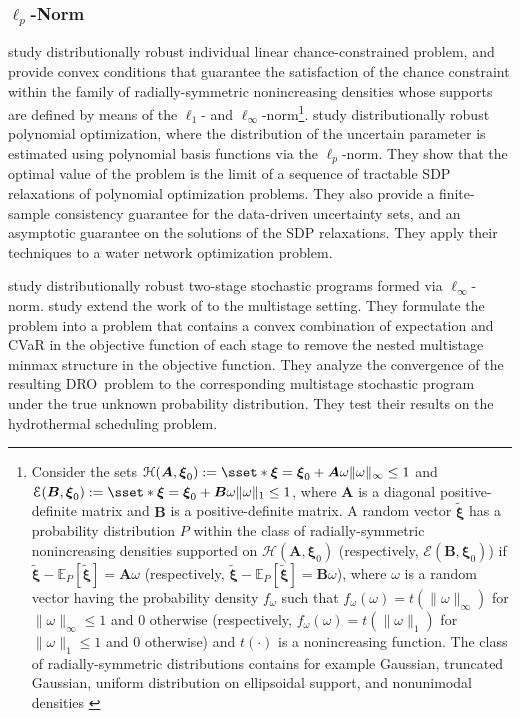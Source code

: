 \documentclass[final,onefignum,onetabnum]{class}
\newcommand{\ee}[2]{\mathbb{E}_{#1} \left[ #2 \right]}
\newcommand{\bs}[1]{\boldsymbol{#1}} %
\newcommand{\Cs}[1]{\mathcal{#1}} %
\newcommand{\txi}{\tilde{\bs{\xi}}}
\newcommand{\dro}{DRO}
\begin{document}
\subsubsection[Lp-Norm]{\texorpdfstring{$\ell_{p}$-Norm}{Lp-Norm}}

\citet{calafiore2006} study distributionally robust individual linear chance-constrained problem, and provide convex conditions that guarantee the satisfaction of the chance constraint   within the family of radially-symmetric nonincreasing densities whose supports are defined by means of the $\ell_{1}$- and $\ell_{\infty}$-norm\footnote{Consider the sets $\Cs{H}(\bs{A},\bs{\xi}_{0}):=\sset*{\bs{\xi}=\bs{\xi}_{0} + \bs{A} \omega}{\|\omega\|_{\infty} \le 1}$ and $\Cs{E}(\bs{B},\bs{\xi}_{0}):=\sset*{\bs{\xi}=\bs{\xi}_{0} + \bs{B} \omega}{\|\omega\|_{1} \le 1}$, where $\bs{A}$ is a diagonal positive-definite matrix and $\bs{B}$ is a positive-definite matrix. 
A random vector $\txi$ has a probability distribution $P$ within the class of radially-symmetric nonincreasing densities supported on  $\Cs{H}(\bs{A},\bs{\xi}_{0})$ (respectively, $\Cs{E}(\bs{B},\bs{\xi}_{0})$) if $\txi - \ee{P}{\txi}= \bs{A} \omega$ (respectively, $\txi - \ee{P}{\txi}= \bs{B} \omega$), where $\omega$ is a random vector having the probability density $f_{\omega}$ such that 
$f_{\omega}(\omega)= t(\|\omega\|_{\infty})$ for $\|\omega\|_{\infty} \le 1$ and $0$ otherwise (respectively, $f_{\omega}(\omega)= t(\|\omega\|_{1})$ for $\|\omega\|_{1} \le 1$ and $0$ otherwise) and $t(\cdot)$ is a nonincreasing function. The class of radially-symmetric distributions contains for example Gaussian, truncated Gaussian, uniform distribution on ellipsoidal support, and nonunimodal densities \citep{calafiore2006}}.
\citet{mevissen2013} study distributionally robust polynomial optimization, where the  distribution of the uncertain parameter is estimated using polynomial basis functions via the $\ell_{p}$-norm. They show that
the optimal value of the problem is the limit of a sequence of
tractable SDP relaxations of polynomial optimization problems. They also provide a  finite-sample  consistency  guarantee for the data-driven uncertainty sets, and an asymptotic guarantee on the solutions of the SDP relaxations. They apply their techniques to  a water network optimization problem.

\citet{jiang2018} study  distributionally robust two-stage  stochastic programs \linebreak formed via $\ell_{\infty}$-norm. 
\citet{huang2017} study extend the work of \citet{jiang2018} to the multistage setting. They formulate the problem into a problem that contains a convex combination of expectation and CVaR in the objective function of each stage  to remove the nested multistage minmax structure in the objective function. They  analyze the convergence of the resulting \dro\ problem to  the corresponding multistage stochastic program under the true unknown probability distribution. They test their results on the hydrothermal scheduling problem.  
\end{document}
